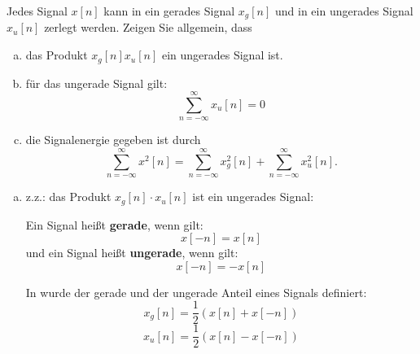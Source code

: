 \begin{uebsp}
    \begin{Exercise}
        Jedes Signal $x[n]$ kann in ein gerades Signal $x_g[n]$ und in ein ungerades Signal $x_u[n]$ zerlegt werden. Zeigen Sie allgemein, dass 
        \begin{enumerate}[a)]
            \item das Produkt $x_g[n]x_u[n]$ ein ungerades Signal ist.
            \item für das ungerade Signal gilt:
                \[\sum_{n=-\infty}^\infty x_u[n]=0\]
            \item die Signalenergie gegeben ist durch
                \[\sum_{n=-\infty}^\infty x^2[n]=\sum_{n=-\infty}^\infty x_g^2[n]+\sum_{n=-\infty}^\infty x_u^2[n].\]
        \end{enumerate}
    \end{Exercise}
    \begin{Answer}
        \begin{enumerate}[a)]
            \item z.z.: das Produkt $x_g[n]\cdot x_u[n]$ ist ein ungerades Signal:\label{itm:ugmul}
                \begin{definition}\label{def:geradeungeradedef}
                        Ein Signal heißt \textbf{gerade}, wenn gilt:
                        \[x[-n]=x[n]\]
                        und ein Signal heißt \textbf{ungerade}, wenn gilt:
                        \[x[-n]=-x[n]\]
                    \end{definition}

                    \begin{uebsp_theory}
                        In  wurde der gerade und der ungerade Anteil eines Signals definiert:
                        \[x_g[n]=\frac{1}{2}(x[n]+x[-n])\]
                        \[x_u[n]=\frac{1}{2}(x[n]-x[-n])\]
                    \end{uebsp_theory}


\end{enumerate}
\end{Answer}
\end{uebsp}
